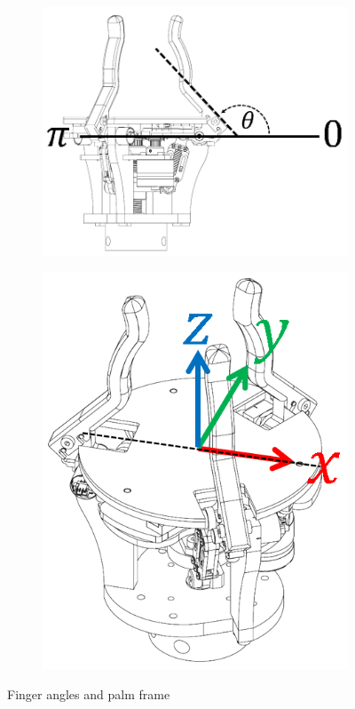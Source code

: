 \documentclass[letterpaper,notitlepage,10pt]{article}
\begin{document}
\begin{figure}[t]
\centering
\begin{subfigure}{0.45\textwidth}
\includegraphics[width=\textwidth]{figures/finger_angle.png}
\end{subfigure}
\quad
\quad
\begin{subfigure}{0.3\textwidth}
\includegraphics[width=\textwidth]{figures/palm_frame.png}
\end{subfigure}
\caption{Finger angles and palm frame}
\label{fig:hand_diagram}
\end{figure}
\end{document}
